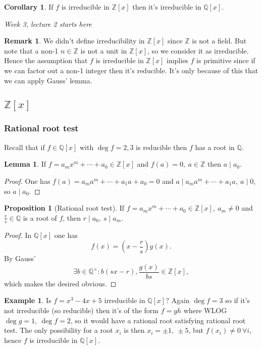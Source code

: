\documentclass[a4paper]{article}
\newcommand{\Z}{\mathbb Z}
\newcommand{\Q}{\mathbb Q}
\theoremstyle{definition}
\newtheorem{prop}[defn]{Proposition}
\newtheorem{lemma}[defn]{Lemma}
\newtheorem{coro}[defn]{Corollary}
\newtheorem{example}[defn]{Example}
\newtheorem*{remark}{Remark}
\begin{document}
\begin{coro}
If $f$ is irreducible in $\Z[x]$ then it's irreducible in $\Q[x]$.
\end{coro}

\begin{flushright}
\textit{Week 3, lecture 2 starts here}
\end{flushright}

\begin{remark}
We didn't define irreducibility in $\Z[x]$ since $\Z$ is not a field. But note that a non-1 $n\in\Z$ is not a unit in $\Z[x]$, so we consider it as irreducible. Hence the assumption that $f$ is irreducible in $\Z[x]$ implies $f$ is primitive since if we can factor out a non-1 integer then it's reducible. It's only because of this that we can apply Gauss' lemma.
\end{remark}

\subsection{$\Z[x]$}
\subsubsection{Rational root test}
Recall that if $f\in\Q[x]$ with $\deg f=2,3$ is reducible then $f$ has a root in $\Q$.
\begin{lemma}
If $f=a_m x^m+\cdots+a_0\in\Z[x]$ and $f(a)=0,\ a\in\Z$ then $a\mid a_0$. 
\end{lemma}
\begin{proof}
One has $f(a)=a_m a^m+\cdots+a_1a+a_0=0$ and $a\mid a_m a^m+\cdots+a_1a,\ a\mid 0$, so $a\mid a_0$.
\end{proof}

\begin{prop}[Rational root test]
If $f=a_mx^m+\cdots +a_0\in\Z[x],\ a_m\neq 0$ and $\frac{r}{s}\in\Q$ is a root of $f$, then $r\mid a_0,\ s\mid a_m$.
\end{prop}
\begin{proof}
In $\Q[x]$ one has
\[
f(x)=\left(x-\frac{r}{s}\right)g(x).
\]
By Gauss'
\[
\exists b\in\Q^\times: b(sx-r),\frac{g(x)}{bs}\in\Z[x],
\]
which makes the desired obvious.
\end{proof}
\begin{example} Is $f=x^3-4x+5$ irreducible in $\Q[x]$? Again $\deg f=3$ so if it's not irreducible (so reducible) then it's of the form $f=gh$ where WLOG $\deg g=1,\ \deg f=2$, so it would have a rational root satisfying rational root test. The only possibility for a root $x_i$ is then $x_i=\pm 1,\ \pm 5$, but $f(x_i)\neq 0 \ \forall i$, hence $f$ is irreducible in $\Q[x]$.
\end{example}
\end{document}

